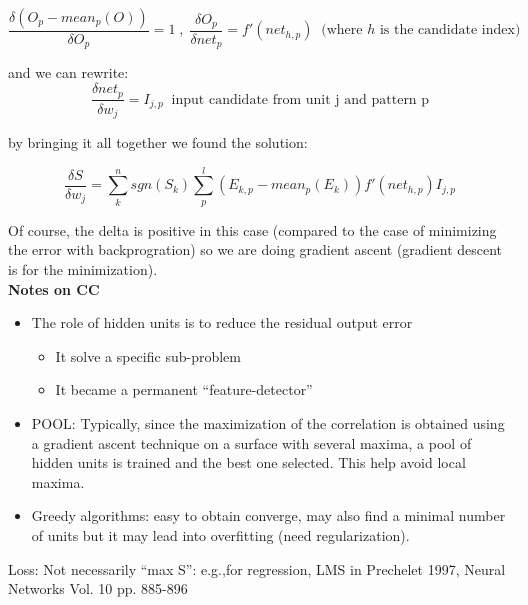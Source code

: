 \documentclass[../main.tex]{subfiles}
\begin{document}
$$ \frac{\delta (O_p - mean_p(O))}{\delta O_p} = 1 \;, \; \frac{\delta O_p}{\delta net_p} = f'(net_{h,p}) \;\; \text{(where $h$ is the candidate index)} $$

and we can  rewrite:
$$ \frac{\delta net_p}{\delta w_j} = I_{j,p} \;\; \text{input candidate from unit j and pattern p}$$

by bringing it all together we found the solution:

$$ \frac{\delta S}{\delta w_j} = \sum_{k}^{n} sgn(S_k) \sum_{p}^{l} (E_{k,p} - mean_p(E_k))f'(net_{h,p})I_{j,p} $$

Of course, the delta is positive in this case (compared to the case of minimizing the error with backprogration) so we are doing gradient ascent (gradient descent is for the minimization).\\


\textbf{Notes on CC}
\begin{itemize}
    \item The role of hidden units is to reduce the residual output error
    \begin{itemize}
        \item It solve a specific sub-problem
        \item It became a permanent “feature-detector”
    \end{itemize}
    \item POOL: Typically, since the maximization of the correlation is obtained using a gradient ascent technique on a surface with several maxima, a pool of hidden units is trained and the best one selected. This help avoid local maxima.
    \item Greedy algorithms: easy to obtain converge, may also find a minimal number of units but it may lead into overfitting (need regularization).
\end{itemize}
Loss: Not necessarily “max S”: e.g.,for regression, LMS in Prechelet 1997, Neural Networks Vol. 10 pp. 885-896
\end{document}
